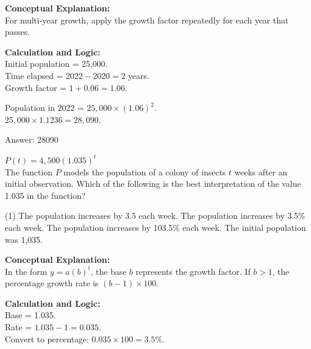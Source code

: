 \documentclass[11pt,paper=a4,answers]{exam}
\begin{document}
\begin{questions}
\begin{solution}
\textbf{Conceptual Explanation:} \\
For multi-year growth, apply the growth factor repeatedly for each year that passes.

\vspace{20pt}

\textbf{Calculation and Logic:} \\
Initial population = 25,000. \\
Time elapsed = $2022 - 2020 = 2$ years. \\
Growth factor = $1 + 0.06 = 1.06$.

\vspace{10pt}

Population in 2022 = $25,000 \times (1.06)^2$. \\
$25,000 \times 1.1236 = 28,090$.

\vspace{25pt}

Answer: \colorbox{yellow!100}{28090}
\end{solution}

\vspace{40pt}

\question
$P(t) = 4,500(1.035)^t$ \\
The function $P$ models the population of a colony of insects $t$ weeks after an initial observation. Which of the following is the best interpretation of the value 1.035 in the function?
\begin{tasks}(1)
    \task The population increases by 3.5 each week.
    \task The population increases by 3.5\% each week.
    \task The population increases by 103.5\% each week.
    \task The initial population was 1,035.
\end{tasks}

\begin{solution}
\textbf{Conceptual Explanation:} \\
In the form $y = a(b)^t$, the base $b$ represents the growth factor. If $b > 1$, the percentage growth rate is $(b - 1) \times 100$.

\vspace{20pt}

\textbf{Calculation and Logic:} \\
Base = 1.035. \\
Rate = $1.035 - 1 = 0.035$. \\
Convert to percentage: $0.035 \times 100 = 3.5\%$.


\end{solution}
\end{questions}
\end{document}
